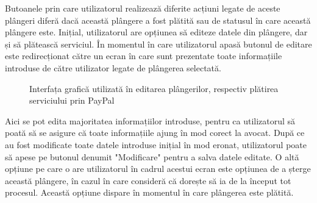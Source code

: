 \documentclass[12pt,a4paper]{report}
\theoremstyle{definition}
\theoremstyle{remark}
\begin{document}
Butoanele prin care utilizatorul realizează diferite acțiuni legate de aceste plângeri diferă dacă această plângere a fost plătită sau de statusul în care această plângere este. Inițial, utilizatorul are opțiunea să editeze datele din plângere, dar și să plătească serviciul. În momentul în care utilizatorul apasă butonul de editare este redirecționat către un ecran în care sunt prezentate toate informațiile introduse de către utilizator legate de plângerea selectată.
\begin{figure}[H]
  \centering
  \hspace{2.0cm}
  \caption{Interfața grafică utilizată în editarea plângerilor, respectiv plătirea serviciului prin PayPal}
\end{figure}
 Aici se pot edita majoritatea informațiilor introduse, pentru ca utilizatorul să poată să se asigure că toate informațiile ajung în mod corect la avocat. După ce au fost modificate toate datele introduse inițial în mod eronat, utilizatorul poate să apese pe butonul denumit "Modificare" pentru a salva datele editate. O altă opțiune pe care o are utilizatorul în cadrul acestui ecran este opțiunea de a șterge această plângere, în cazul în care consideră că dorește să ia de la început tot procesul. Această opțiune dispare în momentul în care plângerea este plătită. 
 
\end{document}
